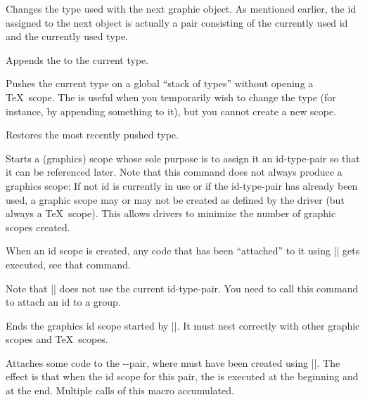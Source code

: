 \begin{command}{\pgfsys@use@type{}}
  Changes the type used with the next graphic object.
  As mentioned earlier, the id assigned to the next object is actually
  a pair consisting of the currently used id and the currently used
  type. 
\end{command}

\begin{command}{\pgfsys@append@type{}}
  Appends the  to the current type. 
\end{command}

\begin{command}{\pgfsys@push@type}
  Pushes the current type on a global ``stack of types'' without
  opening a \TeX\ scope. The is useful when you temporarily wish to
  change the type (for instance, by appending something to it), but
  you cannot create a new scope.
\end{command}

\begin{command}{\pgfsys@pop@type}
  Restores the most recently pushed type.
\end{command}

\begin{command}{\pgfsys@begin@idscope}
  Starts a (graphics) scope whose sole purpose is to assign it an
  id-type-pair so that it can be referenced later. Note that this
  command does not always produce a graphics scope: If not id is
  currently in use or if the id-type-pair has already been used,
  a graphic scope may or may not be created as defined by the driver
  (but always a \TeX\ scope). This allows drivers to minimize the
  number of graphic scopes created.

  When an id scope is created, any code that has been ``attached'' to
  it using |\pgfsys@attach@to@id| gets executed, see that command.

  Note that |\pgfsys@beginscope| does not use the current
  id-type-pair. You need to call this command to attach an id to a
  group. 
\end{command}

\begin{command}{\pgfsys@end@idscope}
  Ends the graphics id scope started by |\pgfsys@end@idscope|. It must
  nest correctly with other graphic scopes and \TeX\ scopes.
\end{command}


\begin{command}{\pgfsys@attach@to@id{}}
  Attaches some code to the --pair, where
   must have been created using |\pgfsys@new@id|. The effect
  is that when the id scope for this pair, the  is
  executed at the beginning and  at the end. Multiple
  calls of this macro accumulated.
\end{command}


